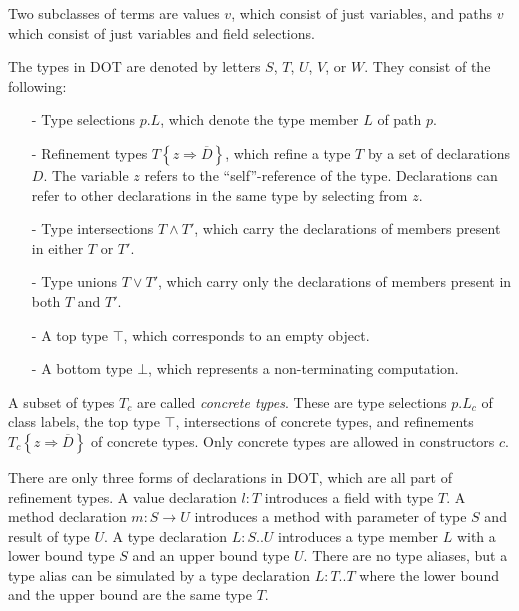 \documentclass[9pt]{sigplanconf}
\newcommand{\tfun}{\rightarrow}
\newcommand{\tand}{\wedge}
\newcommand{\tor}{\vee}
\newcommand{\refine}[2]{\left\{#1 \Rightarrow #2 \right\}}
\newcommand{\seq}[1]{\overline{#1}}
\newcommand{\Ldecl}[3]{#1 : #2..#3}%
\newcommand{\ldecl}[2]{#1 : #2}
\newcommand{\mdecl}[3]{#1 : #2 \tfun #3}
\newcommand{\Top}{\top}%
\newcommand{\Bot}{\bot}%
\begin{document}
Two subclasses of terms are values $v$, which consist of just
variables, and paths $v$ which consist of just variables and field
selections.

The types in DOT are denoted by letters $S$, $T$, $U$, $V$, or $W$. They consist of the following:
\begin{itemize}
\item[-] Type selections $p.L$, which denote the type member $L$ of path $p$.
\item[-] Refinement types $T \refine z {\seq D}$, which refine a type $T$ by a set of declarations $D$.
         The variable $z$ refers to the ``self''-reference of the type. Declarations can refer to
         other declarations in the same type by selecting from $z$.
\item[-] Type intersections $T \tand T'$, which carry the declarations of members present in either $T$ or $T'$.
\item[-] Type unions $T \tor T'$, which carry only the declarations of members present in both $T$ and $T'$.
\item[-] A top type $\Top$, which corresponds to an empty object.
\item[-] A bottom type $\Bot$, which represents a non-terminating computation.
\end{itemize}
A subset of types $T_c$ are called {\em concrete types}. These are type selections
$p.L_c$ of class labels,
the top type $\Top$, intersections of concrete types, and refinements $T_c \refine z {\seq D}$ of concrete types. Only concrete types are allowed in constructors $c$.

There are only three forms of declarations in DOT, which are all part
of refinement types.  A value declaration $\ldecl l T$ introduces a
field with type $T$.  A method declaration $\mdecl m S U$ introduces a
method with parameter of type $S$ and result of type $U$. A type
declaration $\Ldecl L S U$ introduces a type member $L$ with a lower
bound type $S$ and an upper bound type $U$. There are no type aliases,
but a type alias can be simulated by a type declaration $\Ldecl L T T$
where the lower bound and the upper bound are the same type $T$.
\end{document}
